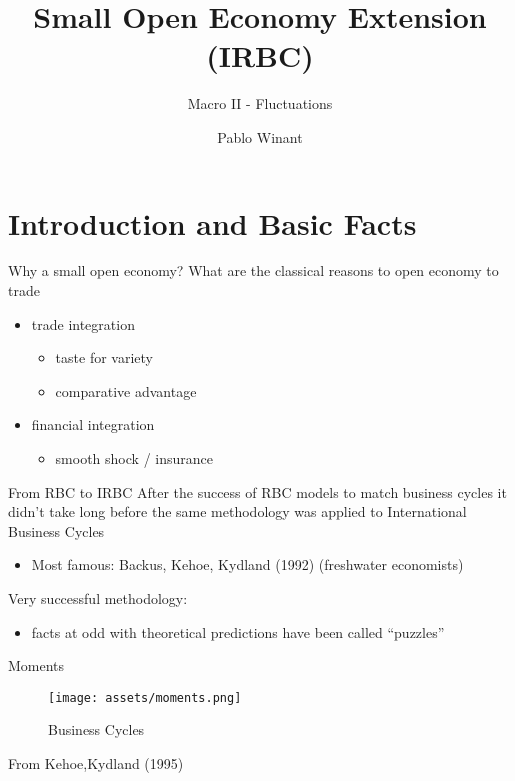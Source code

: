 \documentclass[
  ignorenonframetext,
]{beamer}
\title{Small Open Economy Extension (IRBC)}
\subtitle{Macro II - Fluctuations}
\author{Pablo Winant}
\date{}
\providecommand{\tightlist}{%
  \setlength{\itemsep}{0pt}\setlength{\parskip}{0pt}}\usepackage{longtable,booktabs,array}
\begin{document}
\frame{\titlepage}

\section{Introduction and Basic
Facts}\label{introduction-and-basic-facts}

\begin{frame}{Why a small open economy?}
\label{why-a-small-open-economy}
What are the classical reasons to open economy to trade

\begin{itemize}[<+->]
\tightlist
\item
  trade integration

  \begin{itemize}[<+->]
  \tightlist
  \item
    taste for variety
  \item
    comparative advantage
  \end{itemize}
\item
  financial integration

  \begin{itemize}[<+->]
  \tightlist
  \item
    smooth shock / insurance
  \end{itemize}
\end{itemize}
\end{frame}

\begin{frame}{From RBC to IRBC}
\label{from-rbc-to-irbc}
After the success of RBC models to match business cycles it didn't take
long before the same methodology was applied to International Business
Cycles

\begin{itemize}
\tightlist
\item
  Most famous: Backus, Kehoe, Kydland (1992) (freshwater economists)
\end{itemize}

Very successful methodology:

\begin{itemize}
\tightlist
\item
  facts at odd with theoretical predictions have been called ``puzzles''
\end{itemize}
\end{frame}

\begin{frame}{Moments}
\label{moments}
\begin{figure}[H]

{\centering \texttt{[image: assets/moments.png]}

}

\caption{Business Cycles}

\end{figure}%

From Kehoe,Kydland (1995)
\end{frame}
\end{document}
